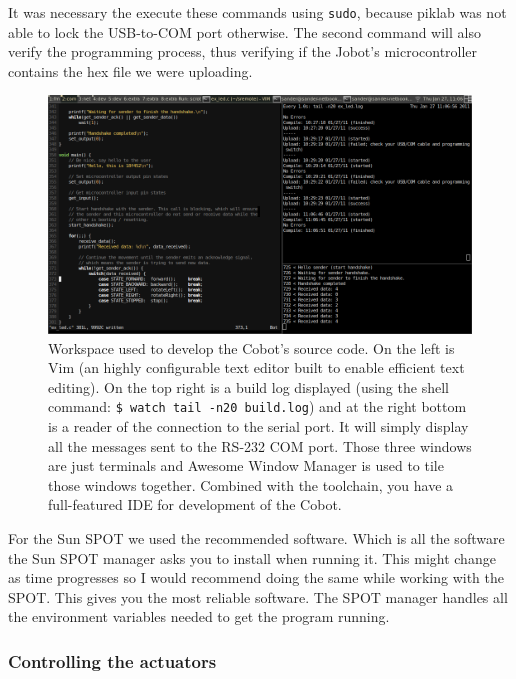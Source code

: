 \documentclass[a4paper,10pt]{article} %
\begin{document}
It was necessary the execute these commands using \texttt{sudo}, because
piklab was not able to lock the USB-to-COM port otherwise. The second command
will also verify the programming process, thus verifying if the Jobot's
microcontroller contains the hex file we were uploading.

\begin{figure}[H]
\hspace{-1.2in}
\includegraphics[scale=0.5]{img/workspace}
\caption{Workspace used to develop the Cobot's source code. On the left is Vim
(an highly configurable text editor built to enable efficient text editing). On
the top right is a build log displayed (using the shell command: \texttt{\$
watch tail -n20 build.log}) and at the right bottom is a reader of the
connection to the serial port. It will simply display all the messages sent to
the RS-232 COM port. Those three windows are just terminals and Awesome
Window Manager is used to tile those windows together. Combined with the
toolchain, you have a full-featured IDE for development of the Cobot.}
\end{figure}

For the Sun SPOT we used the recommended software. Which is all
the software the Sun SPOT manager asks you to install when running it. This
might change as time progresses so I would recommend doing the same while
working with the SPOT. This gives you the most reliable software. The
SPOT manager handles all the environment variables needed to get
the program running.


\subsubsection{Controlling the actuators} %
\label{sub:Cobot implementation}
\end{document}
